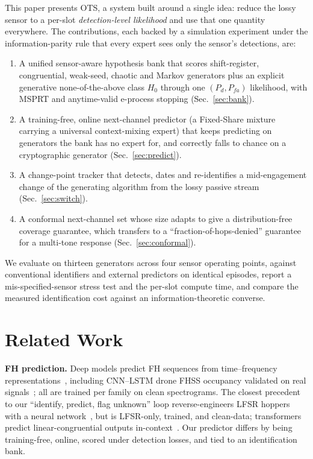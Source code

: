 \documentclass[conference]{IEEEtran}
\begin{document}
This paper presents OTS, a system built around a single idea: reduce the lossy
sensor to a per-slot \emph{detection-level likelihood} and use that one
quantity everywhere. The contributions, each backed by a simulation
experiment under the information-parity rule that every expert sees only the
sensor's detections, are:
\begin{enumerate}
\item A unified sensor-aware hypothesis bank that scores shift-register,
congruential, weak-seed, chaotic and Markov generators plus an explicit
generative none-of-the-above class $H_0$ through one $(P_d,P_{fa})$ likelihood,
with MSPRT and anytime-valid e-process stopping (Sec.~\ref{sec:bank}).
\item A training-free, online next-channel predictor (a Fixed-Share mixture
carrying a universal context-mixing expert) that keeps predicting on generators
the bank has no expert for, and correctly falls to chance on a cryptographic
generator (Sec.~\ref{sec:predict}).
\item A change-point tracker that detects, dates and re-identifies a
mid-engagement change of the generating algorithm from the lossy passive stream
(Sec.~\ref{sec:switch}).
\item A conformal next-channel set whose size adapts to give a
distribution-free coverage guarantee, which transfers to a
``fraction-of-hops-denied'' guarantee for a multi-tone response
(Sec.~\ref{sec:conformal}).
\end{enumerate}
We evaluate on thirteen generators across four sensor operating points,
against conventional identifiers and external predictors on identical
episodes, report a mis-specified-sensor stress test and the per-slot compute
time, and compare the measured identification cost against an
information-theoretic converse.

\section{Related Work}
\textbf{FH prediction.} Deep models predict FH sequences from time--frequency
representations~\cite{li2020lstm,li2021china,zhu2023recovery,lee2020detection},
including CNN--LSTM drone FHSS occupancy validated on real
signals~\cite{basak2024spectrum}; all are trained per family on clean
spectrograms. The closest precedent to our ``identify, predict, flag unknown''
loop reverse-engineers LFSR hoppers with a neural network~\cite{strickland2023},
but is LFSR-only, trained, and clean-data; transformers predict
linear-congruential outputs in-context~\cite{tao2025transformers}. Our predictor
differs by being training-free, online, scored under detection losses, and tied
to an identification bank.
\end{document}
